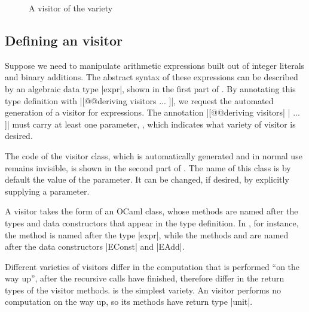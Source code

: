 \documentclass[11pt,a4paper,twoside]{article}
\begin{document}


\begin{figure}[t]
\vspace{-\baselineskip}
\caption{A visitor of the \iter variety}
\label{fig:expr00}
\end{figure}

\subsection{Defining an \iter visitor}
\label{sec:intro:iter:def}

Suppose we need to manipulate arithmetic expressions built out of integer
literals and binary additions. The abstract syntax of these expressions can be
described by an algebraic data type \oc|expr|, shown in the first part of
.
%
By annotating this type definition with \oc|[@@deriving visitors { ... }]|, we
request the automated generation of a visitor for expressions. The annotation
\oc|[@@deriving visitors| \oc|{ ... }]| must carry at least one parameter,
\variety, which indicates what variety of visitor is desired.

The code of the visitor class, which is automatically generated and in normal
use remains invisible, is shown in the second part of . The
name of this class is by default the value of the \variety parameter. It can
be changed, if desired, by explicitly supplying a \name parameter.

A visitor takes the form of an OCaml class, whose methods are named after the
types and data constructors that appear in the type definition. In
, for instance, the method  is named after
the type \oc|expr|, while the methods  and
 are named after the data constructors \oc|EConst| and
\oc|EAdd|.

Different varieties of visitors differ in the computation that is performed
``on the way up'', after the recursive calls have finished, therefore differ
in the return types of the visitor methods. \iter is the simplest variety. An
\iter visitor performs no computation on the way up, so its methods have
return type \oc|unit|.
\end{document}
